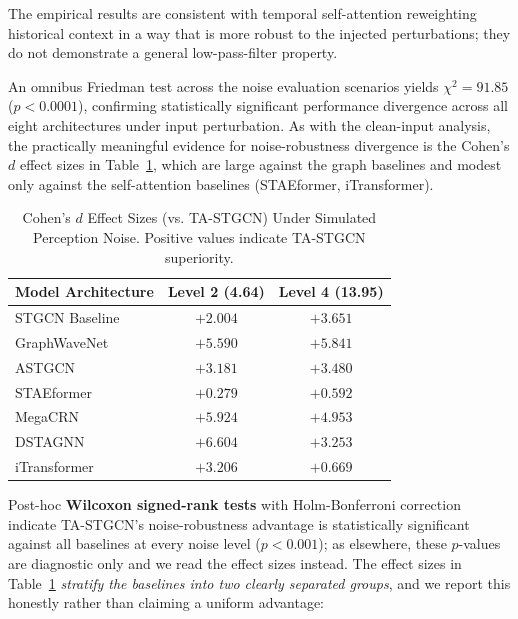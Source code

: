 \documentclass[a4paper,fleqn]{cas-sc}
\begin{document}
The empirical results are consistent with temporal self-attention reweighting historical context in a way that is more robust to the injected perturbations; they do not demonstrate a general low-pass-filter property.

An omnibus Friedman test across the noise evaluation scenarios yields $\chi^2 = 91.85$ ($p < 0.0001$), confirming statistically significant performance divergence across all eight architectures under input perturbation. As with the clean-input analysis, the practically meaningful evidence for noise-robustness divergence is the Cohen's $d$ effect sizes in Table~\ref{tab:noise_robustness_effects}, which are large against the graph baselines and modest only against the self-attention baselines (STAEformer, iTransformer).

\begin{table}[pos=htbp]
\centering
\footnotesize
\setlength{\tabcolsep}{4pt}
\renewcommand{\arraystretch}{1.1}
\caption{Cohen's $d$ Effect Sizes (vs. TA-STGCN) Under Simulated Perception Noise. Positive values indicate TA-STGCN superiority.}
\label{tab:noise_robustness_effects}
\begin{tabular}{lcc}
\toprule
\textbf{Model Architecture} & \textbf{Level 2 (4.64)} & \textbf{Level 4 (13.95)} \\
\midrule
STGCN Baseline \cite{stgcn} & $+2.004$ & $+3.651$ \\
GraphWaveNet \cite{wavenet} & $+5.590$ & $+5.841$ \\
ASTGCN \cite{astgcn} & $+3.181$ & $+3.480$ \\
STAEformer \cite{staeformer} & $+0.279$ & $+0.592$ \\
MegaCRN \cite{megacrn} & $+5.924$ & $+4.953$ \\
DSTAGNN \cite{dstagnn} & $+6.604$ & $+3.253$ \\
iTransformer \cite{itransformer} & $+3.206$ & $+0.669$ \\
\bottomrule
\end{tabular}%
\end{table}

Post-hoc \textbf{Wilcoxon signed-rank tests} with Holm-Bonferroni correction indicate TA-STGCN's noise-robustness advantage is statistically significant against all baselines at every noise level ($p < 0.001$); as elsewhere, these $p$-values are diagnostic only and we read the effect sizes instead. The effect sizes in Table~\ref{tab:noise_robustness_effects} \emph{stratify the baselines into two clearly separated groups}, and we report this honestly rather than claiming a uniform advantage:
\end{document}
